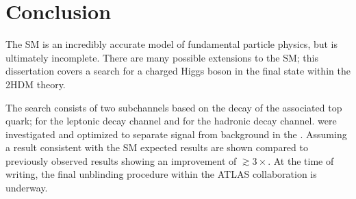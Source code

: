 \chapter{Conclusion}\label{chap:conclusions}
	The \acrlong{SM} is an incredibly accurate model of fundamental particle physics, but is ultimately incomplete. There are many possible extensions to the \acrlong{SM}; this dissertation covers a search for a charged Higgs boson in the \HpmLong final state within the \acrfull{2HDM} theory. 

	The search consists of two subchannels based on the decay of the associated top quark; \taulep for the leptonic decay channel and \taujets for the hadronic decay channel.  were investigated and optimized to separate signal from background in the . Assuming a result consistent with the \gls{SM} expected results are shown compared to previously observed results showing an improvement of $\gtrsim 3\times$. At the time of writing, the final unblinding procedure within the \gls{ATLAS} collaboration is underway.